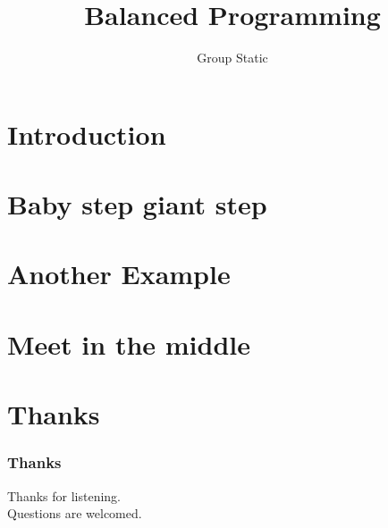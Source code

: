 \documentclass[landscape]{beamer}
\begin{document}
	\title{\textbf{Balanced Programming}}
	\author{Group Static}
	\maketitle
	\section{Introduction}
	
	\section{Baby step giant step}
	
	\section{Another Example}
	
	\section{Meet in the middle}
	
	\section{Thanks}
	\begin{frame}
		\frametitle{Thanks}
		Thanks for listening.\\
		Questions are welcomed.
	\end{frame}
\end{document}
